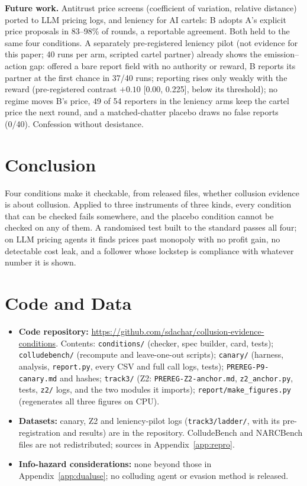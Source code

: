 \documentclass[11pt]{article}
\newcommand{\code}[1]{\texttt{#1}}
\begin{document}
\noindent\textbf{Future work.} Antitrust price screens (coefficient of variation, relative distance) ported
to LLM pricing logs, and leniency for AI cartels: B adopts A's explicit price proposals in 83--98\%
of rounds, a reportable agreement. Both held to the same four conditions. A separately
pre-registered leniency pilot (not evidence for this paper; 40 runs per arm, scripted cartel partner)
already shows the emission--action gap: offered a bare report field with no authority or reward, B
reports its partner at the first chance in 37/40 runs; reporting rises only weakly with the reward
(pre-registered contrast $+0.10$ [0.00, 0.225], below its threshold); no regime moves B's price,
49 of 54 reporters in the leniency arms keep the cartel price the next round, and a matched-chatter placebo draws no
false reports (0/40). Confession without desistance.

\section{Conclusion}
Four conditions make it checkable, from released files, whether collusion evidence is about
collusion. Applied to three instruments of three kinds, every condition that can be checked fails
somewhere, and the placebo condition cannot be checked on any of them. A randomised test built to the
standard passes all four; on LLM pricing agents it finds prices past monopoly with no profit gain, no
detectable cost leak, and a follower whose lockstep is compliance with whatever number it is shown.

\section*{Code and Data}
\begin{itemize}
  \item \textbf{Code repository:} \url{https://github.com/sdachar/collusion-evidence-conditions}.
        Contents: \code{conditions/} (checker, spec builder, card, tests); \code{colludebench/}
        (recompute and leave-one-out scripts); \code{canary/} (harness, analysis, \code{report.py},
        every CSV and full call logs, tests); \code{PREREG-P9-canary.md} and hashes; \code{track3/} (Z2: \code{PREREG-Z2-anchor.md},
        \code{z2\_anchor.py}, tests, \code{z2/} logs, and the two modules it imports);
        \code{report/make\_figures.py} (regenerates all three figures on CPU).
  \item \textbf{Datasets:} canary, Z2 and leniency-pilot logs (\code{track3/ladder/}, with its
        pre-registration and results) are in the repository. ColludeBench and NARCBench files
        are not redistributed; sources in Appendix~\ref{app:repro}.
  \item \textbf{Info-hazard considerations:} none beyond those in Appendix~\ref{app:dualuse}; no
        colluding agent or evasion method is released.
\end{itemize}
\end{document}
